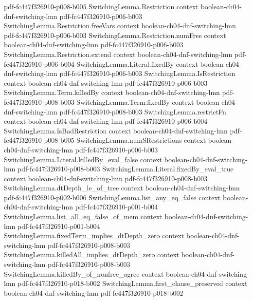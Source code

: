 \begin{theorem}
  {pdf-fc447f326910-p008-b005}
\proofstep
  {SwitchingLemma.Restriction}
  {context}
  {boolean-ch04-dnf-switching-lmn}
  {pdf-fc447f326910-p006-b003}
\proofstep
  {SwitchingLemma.Restriction.freeVars}
  {context}
  {boolean-ch04-dnf-switching-lmn}
  {pdf-fc447f326910-p006-b003}
\proofstep
  {SwitchingLemma.Restriction.numFree}
  {context}
  {boolean-ch04-dnf-switching-lmn}
  {pdf-fc447f326910-p006-b003}
\proofstep
  {SwitchingLemma.Restriction.extend}
  {context}
  {boolean-ch04-dnf-switching-lmn}
  {pdf-fc447f326910-p006-b004}
\proofstep
  {SwitchingLemma.Literal.fixedBy}
  {context}
  {boolean-ch04-dnf-switching-lmn}
  {pdf-fc447f326910-p006-b003}
\proofstep
  {SwitchingLemma.IsRestriction}
  {context}
  {boolean-ch04-dnf-switching-lmn}
  {pdf-fc447f326910-p006-b003}
\proofstep
  {SwitchingLemma.Term.killedBy}
  {context}
  {boolean-ch04-dnf-switching-lmn}
  {pdf-fc447f326910-p008-b003}
\proofstep
  {SwitchingLemma.Term.fixedBy}
  {context}
  {boolean-ch04-dnf-switching-lmn}
  {pdf-fc447f326910-p008-b003}
\proofstep
  {SwitchingLemma.restrictFn}
  {context}
  {boolean-ch04-dnf-switching-lmn}
  {pdf-fc447f326910-p006-b004}
\proofstep
  {SwitchingLemma.IsBadRestriction}
  {context}
  {boolean-ch04-dnf-switching-lmn}
  {pdf-fc447f326910-p008-b005}
\proofstep
  {SwitchingLemma.numSRestrictions}
  {context}
  {boolean-ch04-dnf-switching-lmn}
  {pdf-fc447f326910-p006-b003}
\proofstep
  {SwitchingLemma.Literal.killedBy_eval_false}
  {context}
  {boolean-ch04-dnf-switching-lmn}
  {pdf-fc447f326910-p008-b003}
\proofstep
  {SwitchingLemma.Literal.fixedBy_eval_true}
  {context}
  {boolean-ch04-dnf-switching-lmn}
  {pdf-fc447f326910-p008-b003}
\proofstep
  {SwitchingLemma.dtDepth_le_of_tree}
  {context}
  {boolean-ch04-dnf-switching-lmn}
  {pdf-fc447f326910-p002-b006}
\proofstep
  {SwitchingLemma.list_any_eq_false}
  {context}
  {boolean-ch04-dnf-switching-lmn}
  {pdf-fc447f326910-p001-b004}
\proofstep
  {SwitchingLemma.list_all_eq_false_of_mem}
  {context}
  {boolean-ch04-dnf-switching-lmn}
  {pdf-fc447f326910-p001-b004}
\proofstep
  {SwitchingLemma.fixedTerm_implies_dtDepth_zero}
  {context}
  {boolean-ch04-dnf-switching-lmn}
  {pdf-fc447f326910-p008-b003}
\proofstep
  {SwitchingLemma.killedAll_implies_dtDepth_zero}
  {context}
  {boolean-ch04-dnf-switching-lmn}
  {pdf-fc447f326910-p008-b003}
\proofstep
  {SwitchingLemma.killedBy_of_nonfree_agree}
  {context}
  {boolean-ch04-dnf-switching-lmn}
  {pdf-fc447f326910-p018-b002}
\proofstep
  {SwitchingLemma.first_clause_preserved}
  {context}
  {boolean-ch04-dnf-switching-lmn}
  {pdf-fc447f326910-p018-b002}
\proofstep

\end{theorem}
